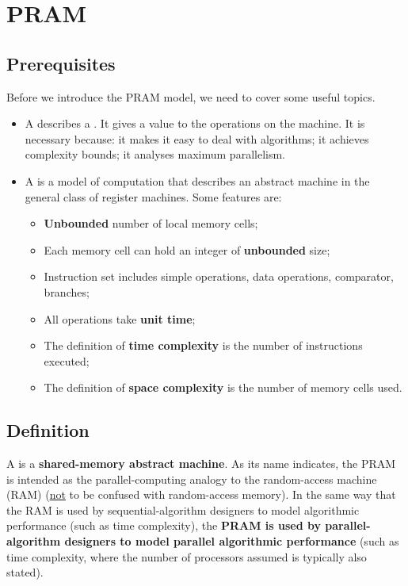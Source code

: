 \section{PRAM}

\subsection{Prerequisites}

Before we introduce the PRAM model, we need to cover some useful topics.
\begin{itemize}
    \item A  describes a . It gives a value to the operations on the machine. It is necessary because: it makes it easy to deal with algorithms; it achieves complexity bounds; it analyses maximum parallelism.

    \item A  is a model of computation that describes an abstract machine in the general class of register machines. Some features are:
    \begin{itemize}
        \item \textbf{Unbounded} number of local memory cells;
        \item Each memory cell can hold an integer of \textbf{unbounded} size;
        \item Instruction set includes simple operations, data operations, comparator, branches;
        \item All operations take \textbf{unit time};
        \item The definition of \textbf{time complexity} is the number of instructions executed;
        \item The definition of \textbf{space complexity} is the number of memory cells used.
    \end{itemize}
\end{itemize}

\longline

\subsection{Definition}

\begin{definitionbox}[: PRAM]
    A  is a \textbf{shared-memory abstract machine}. As its name indicates, the PRAM is intended as the parallel-computing analogy to the random-access machine (RAM) (\underline{not} to be confused with random-access memory). In the same way that the RAM is used by sequential-algorithm designers to model algorithmic performance (such as time complexity), the \textbf{PRAM is used by parallel-algorithm designers to model parallel algorithmic performance} (such as time complexity, where the number of processors assumed is typically also stated).
\end{definitionbox}

